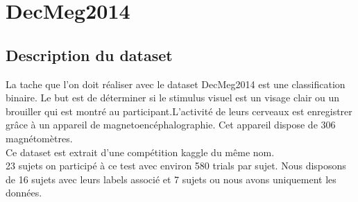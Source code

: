 \documentclass{article}[12pt]
\begin{document}
\section{DecMeg2014}
\subsection{Description du dataset}
La tache que l'on doit réaliser avec le dataset DecMeg2014 est une classification binaire. Le but est de déterminer si le stimulus visuel est un visage clair ou un brouiller qui est montré au participant.L'activité de leurs cerveaux est enregistrer grâce à un appareil de magnetoencéphalographie. Cet appareil dispose de 306 magnétomètres.
\\
Ce dataset est extrait d'une compétition kaggle du même nom.
\\
23 sujets on participé à ce test avec environ 580 trials par sujet. Nous disposons de 16 sujets avec leurs labels associé et 7 sujets ou nous avons uniquement les données.
\end{document}

